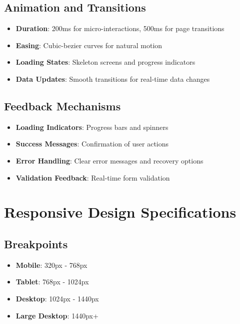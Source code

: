 \subsection{Animation and Transitions}
\begin{itemize}
\item \textbf{Duration}: 200ms for micro-interactions, 500ms for page transitions
\item \textbf{Easing}: Cubic-bezier curves for natural motion
\item \textbf{Loading States}: Skeleton screens and progress indicators
\item \textbf{Data Updates}: Smooth transitions for real-time data changes
\end{itemize}

\subsection{Feedback Mechanisms}
\begin{itemize}
\item \textbf{Loading Indicators}: Progress bars and spinners
\item \textbf{Success Messages}: Confirmation of user actions
\item \textbf{Error Handling}: Clear error messages and recovery options
\item \textbf{Validation Feedback}: Real-time form validation
\end{itemize}


\section{Responsive Design Specifications}

\subsection{Breakpoints}
\begin{itemize}
\item \textbf{Mobile}: 320px - 768px
\item \textbf{Tablet}: 768px - 1024px
\item \textbf{Desktop}: 1024px - 1440px
\item \textbf{Large Desktop}: 1440px+
\end{itemize}

